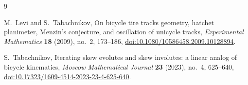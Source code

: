 \documentclass[11pt]{article}
\theoremstyle{remark}
\begin{document}
\clearpage
\begin{thebibliography}{9}

M.~Levi and S.~Tabachnikov,
\newblock On bicycle tire tracks geometry, hatchet planimeter, Menzin's
conjecture, and oscillation of unicycle tracks,
\newblock \emph{Experimental Mathematics} \textbf{18} (2009), no.~2,
173--186,
\newblock \href{https://doi.org/10.1080/10586458.2009.10128894}
{doi:10.1080/10586458.2009.10128894}.

S.~Tabachnikov,
\newblock Iterating skew evolutes and skew involutes: a linear analog of
bicycle kinematics,
\newblock \emph{Moscow Mathematical Journal} \textbf{23} (2023), no.~4,
625--640,
\newblock \href{https://doi.org/10.17323/1609-4514-2023-23-4-625-640}
{doi:10.17323/1609-4514-2023-23-4-625-640}.

\end{thebibliography}
\end{document}
